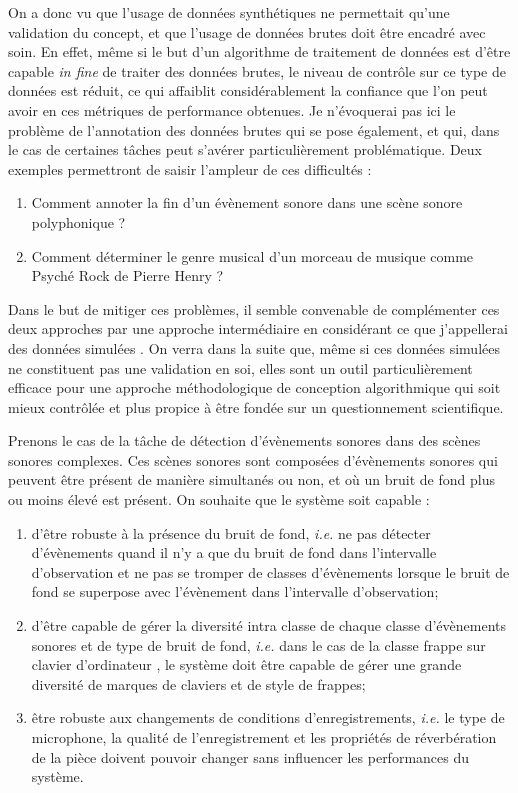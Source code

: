 On a donc vu que l'usage de données synthétiques ne permettait qu'une validation du concept, et que l'usage de données brutes doit être encadré avec soin. En effet, même si le but d'un algorithme de traitement de données est d'être capable \textit{in fine} de traiter des données brutes, le niveau de contrôle sur ce type de données est réduit, ce qui affaiblit considérablement la confiance que l'on peut avoir en ces métriques de performance obtenues. Je n'évoquerai pas ici le problème de l'annotation des données brutes qui se pose également, et qui, dans le cas de certaines tâches peut s'avérer particulièrement problématique. Deux exemples permettront de saisir l'ampleur de ces difficultés :
\begin{enumerate}
  \item Comment annoter la fin d'un évènement sonore dans une scène sonore polyphonique ?
  \item  Comment déterminer le genre musical d'un morceau de musique comme \og Psyché Rock \fg de Pierre Henry ?
\end{enumerate}

Dans le but de mitiger ces problèmes, il semble convenable de complémenter ces deux approches par une approche intermédiaire en considérant ce que j'appellerai des données \og simulées \fg. On verra dans la suite que, même si ces données simulées ne constituent pas une validation en soi, elles sont un outil particulièrement efficace pour une approche méthodologique de conception algorithmique qui soit mieux contrôlée et plus propice à être fondée sur un questionnement scientifique.

Prenons le cas de la tâche de détection d'évènements sonores dans des scènes sonores complexes. Ces scènes sonores sont composées d'évènements sonores qui peuvent être présent de manière simultanés ou non, et où un bruit de fond plus ou moins élevé est présent. On souhaite que le système soit capable :
\begin{enumerate}
  \item d'être robuste à la présence du bruit de fond, \textit{i.e.} ne pas détecter d'évènements quand il n'y a que du bruit de fond dans l'intervalle d'observation et ne pas se tromper de classes d'évènements lorsque le bruit de fond se superpose avec l'évènement  dans l'intervalle d'observation;
  \item d'être capable de gérer la diversité intra classe de chaque classe d'évènements sonores et de type de bruit de fond,  \textit{i.e.} dans le cas de la classe \og frappe sur clavier d'ordinateur \fg, le système doit être capable de gérer une grande diversité de marques de claviers et de style de frappes;
  \item être robuste aux changements de conditions d'enregistrements,  \textit{i.e.} le type de microphone, la qualité de l'enregistrement et les propriétés de réverbération de la pièce doivent pouvoir changer sans influencer les performances du système.
\end{enumerate}

